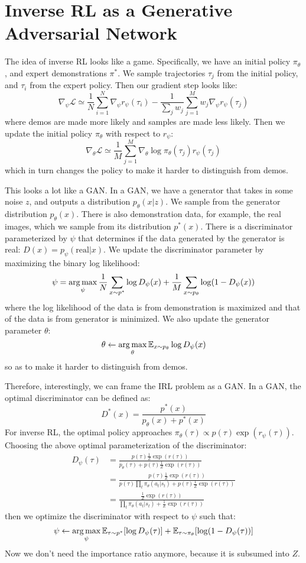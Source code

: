 \section{Inverse RL as a Generative Adversarial Network}
The idea of inverse RL looks like a game. Specifically, we have an initial policy $\pi_\theta$, and expert demonstrations $\pi^*$. We sample trajectories $\tau_j$ from the initial policy, and $\tau_i$ from the expert policy. Then our gradient step looks like:
\[
\nabla_\psi \mathcal{L} \simeq \frac{1}{N}\sum_{i=1}^N\nabla_\psi r_\psi(\tau_i) - \frac{1}{\sum_j w_j}\sum_{j=1}^M w_j\nabla_\psi r_\psi(\tau_j)
\]
where demos are made more likely and samples are made less likely. Then we update the initial policy $\pi_\theta$ with respect to $r_\psi$:
\[
\nabla_\theta\mathcal{L}\simeq \frac{1}{M}\sum_{j=1}^M\nabla_\theta \log \pi_\theta(\tau_j)r_\psi(\tau_j)
\]
which in turn changes the policy to make it harder to distinguish from demos.

This looks a lot like a GAN. In a GAN, we have a generator that takes in some noise $z$, and outputs a distribution $p_\theta(x|z)$. We sample from the generator distribution $p_\theta(x)$. There is also demonstration data, for example, the real images, which we sample from its distribution $p^*(x)$. There is a discriminator parameterized by $\psi$ that determines if the data generated by the generator is real: $D(x) = p_\psi(\text{real}|x)$. We update the discriminator parameter by maximizing the binary log likelihood:
\[
\psi = \operatorname*{arg\,max}_\psi \frac{1}{N}\sum_{x\sim p^*}\log D_\psi(x) + \frac{1}{M}\sum_{x\sim p_\theta}\log(1-D_\psi(x))
\]
where the log likelihood of the data is from demonstration is maximized and that of the data is from generator is minimized. We also update the generator parameter $\theta$:
\[
\theta\leftarrow \operatorname*{arg\,max}_\theta \mathbb{E}_{x\sim p_\theta}\log D_\psi(x)
\]
so as to make it harder to distinguish from demos.

Therefore, interestingly, we can frame the IRL problem as a GAN. In a GAN, the optimal discriminator can be defined as:
\[
D^*(x) = \frac{p^*(x)}{p_\theta(x) + p^*(x)}
\]
For inverse RL, the optimal policy approaches $\pi_\theta(\tau)\propto p(\tau)\exp(r_\psi(\tau))$. Choosing the above optimal parameterization of the discriminator:
\begin{align*}
    D_\psi(\tau) &= \frac{p(\tau)\frac{1}{Z}\exp(r(\tau))}{p_\theta(\tau) + p(\tau)\frac{1}{Z}\exp(r(\tau))}\\
    &= \frac{p(\tau)\frac{1}{Z}\exp(r(\tau))}{p(\tau)\prod_t\pi_\theta(a_t|s_t) + p(\tau)\frac{1}{Z}\exp(r(\tau))}\\
    &= \frac{\frac{1}{Z}\exp(r(\tau))}{\prod_t\pi_\theta(a_t|s_t) + \frac{1}{Z}\exp(r(\tau))}
\end{align*}
then we optimize the discriminator with respect to $\psi$ such that:
\[
\psi \leftarrow \operatorname*{arg\,max}_\psi \mathbb{E}_{\tau\sim p^*}[\log D_\psi(\tau)] + \mathbb{E}_{\tau\sim \pi_\theta}[\log (1-D_\psi(\tau))]
\]
Now we don't need the importance ratio anymore, because it is subsumed into $Z$.

